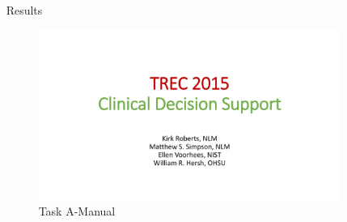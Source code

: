 \documentclass[final]{beamer}
\newlength{\sepwid}
\newlength{\onecolwid}
\newlength{\twocolwid}
\begin{document}
\begin{frame}[t]
\begin{columns}[t]
\begin{column}{\twocolwid}
\begin{columns}[t,totalwidth=\twocolwid]
\begin{column}{\onecolwid}

\end{column} %

\begin{column}{\onecolwid} %



\end{column} %

\end{columns} %

\end{column} %

\begin{column}{\sepwid}\end{column} %

\begin{column}{\onecolwid} %


\begin{block}{Results}
  \begin{figure}
    \centering
    \includegraphics[page=12,trim={7cm 0 7cm 7cm},clip]{images/2015-CDS-Results.pdf}
    \caption{Task A-Manual}
  \end{figure}


\end{block}
\end{column}
\end{columns}
\end{frame}
\end{document}

